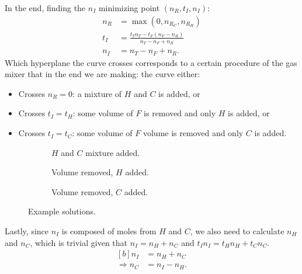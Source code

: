 \documentclass{article}
\begin{document}
In the end, finding the $n_I$ minimizing point $(n_R,t_I,n_I)$:
\begin{align}
    n_R &= \max(0, n_{R_C}, n_{R_H}) \label{eq:nR} \\
    t_I &= \frac{t_T n_T-t_F(n_F-n_R)}{n_T-n_F+n_R} \label{eq:tI} \\
    n_I &= n_T-n_F+n_R. \label{eq:nI}
\end{align}
Which hyperplane the curve crosses corresponds to a certain procedure of
the gas mixer that in the end we are making:
the curve either:
\begin{itemize}
    \item Crosses $n_R=0$:
        a mixture of $H$ and $C$ is added, or
    \item Crosses $t_I=t_H$:
        some volume of $F$ is removed and only $H$ is added, or
    \item Crosses $t_I=t_C$:
        some volume of $F$ volume is removed and only $C$ is added.
\end{itemize}
\begin{figure}
    \begin{center}
        \begin{subfigure}{0.48\textwidth}
            \caption{$H$ and $C$ mixture added.}
        \end{subfigure}
        \vspace{1em}

        \begin{subfigure}{0.48\textwidth}
            \caption{Volume removed, $H$ added.}
        \end{subfigure}
        \begin{subfigure}{0.48\textwidth}
            \caption{Volume removed, $C$ added.}
        \end{subfigure}
    \end{center}
    \caption{%
        Example solutions.
    }
\end{figure}
Lastly, since $n_I$ is composed of moles from $H$ and $C$,
we also need to calculate $n_H$ and $n_C$,
which is trivial given that $n_I=n_H+n_C$ and $t_I n_I=t_H n_H+t_C n_C$.
\begin{equation}\label{eq:nC}
    \begin{aligned}[b]
        n_I &= n_H+n_C \\
        \Rightarrow n_C &= n_I-n_H.
    \end{aligned}
\end{equation}
\end{document}
